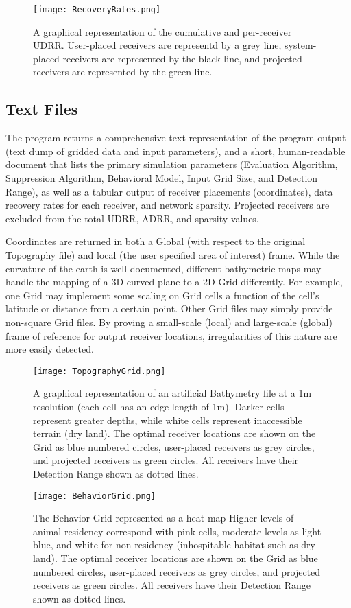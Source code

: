 \begin{figure}[ht]
	\texttt{[image: RecoveryRates.png]}
	\caption{\label{recoveryGraph} A graphical representation of the cumulative and per-receiver UDRR.  User-placed receivers are representd by a grey line, system-placed receivers are represented by the black line, and projected receivers are represented by the green line.} 
\end{figure}

\subsection{Text Files}
The program returns a comprehensive text representation of the program output (text dump of gridded data and input parameters), and a short, human-readable document that lists the primary simulation parameters (Evaluation Algorithm, Suppression Algorithm, Behavioral Model, Input Grid Size, and Detection Range), as well as a tabular output of receiver placements (coordinates), data recovery rates for each receiver, and network sparsity.  Projected receivers are excluded from the total UDRR, ADRR, and sparsity values.

Coordinates are returned in both a Global (with respect to the original Topography file) and local (the user specified area of interest) frame.  While the curvature of the earth is well documented, different bathymetric maps may handle the mapping of a 3D curved plane to a 2D Grid differently.  For example, one Grid may implement some scaling on Grid cells a function of the cell's latitude or distance from a certain point.  Other Grid files may simply provide non-square Grid files.  By proving a small-scale (local) and large-scale (global) frame of reference for output receiver locations, irregularities of this nature are more easily detected.

\begin{figure}[ht]
	\texttt{[image: TopographyGrid.png]}
	\caption{A graphical representation of an artificial Bathymetry file at a 1m resolution (each cell has an edge length of 1m).  Darker cells represent greater depths, while white cells represent inaccessible terrain (dry land).  The optimal receiver locations are shown on the Grid as blue numbered circles, user-placed receivers as grey circles, and projected receivers as green circles.  All receivers have their Detection Range shown as dotted lines.\label{bathyGraph}}
\end{figure}

\begin{figure}[ht]
	\texttt{[image: BehaviorGrid.png]}
	\caption{The Behavior Grid represented as a heat map  Higher levels of animal residency correspond with pink cells, moderate levels as light blue, and white for non-residency (inhospitable habitat such as  dry land).  The optimal receiver locations are shown on the Grid as blue numbered circles, user-placed receivers as grey circles, and projected receivers as green circles.  All receivers have their Detection Range shown as dotted lines.\label{animalGraph}}
\end{figure}

